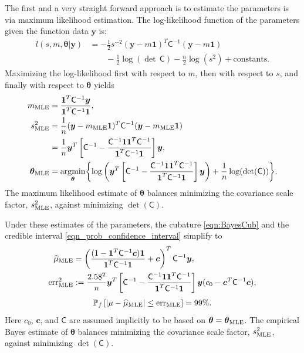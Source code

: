 \documentclass{iitthesis}          %
\newcommand{\bm}[1]{\boldsymbol{#1}}
\newcommand{\vtheta}{{\bm{\theta}}}
\newcommand{\vc}{\bm{c}}
\newcommand{\vy}{\bm{y}}
\newcommand{\vone}{\bm{1}}
\newcommand{\mC}{\mathsf{C}}
\newcommand{\mCInv}{{\mathsf{C}^{-1}}}
\newcommand{\hmu}{\widehat{\mu}}
\newcommand{\MLE}{\textup{MLE}}
\newcommand{\err}{\textup{err}}
\providecommand{\argmin}{\operatorname*{argmin}}
\begin{document}
  \label{sec:MLE}
The first and a very straight forward approach is to estimate the parameters is via maximum likelihood estimation.  The log-likelihood function of the parameters given the function data $\vy$ is:
\begin{align*}
l(s,m,\vtheta | \vy)
&= -\frac{1}{2} s^{-2} (\vy-m\vone)^T\mCInv(\vy-m\vone) 
\\ & \qquad
 - \frac{1}{2} \log(\det\, \mC) - \frac{n}{2} \log(s^2) + \text{constants.}
\end{align*}
Maximizing the log-likelihood first with respect to $m$, then with respect to $s$, and finally with respect to $\vtheta$ yields
\begin{align*}
m_\MLE &= \frac{\vone^T \mCInv \vy }{ \vone^T \mCInv \vone}, \\
\nonumber
s^2_{\MLE}  
&= \frac{1}{n} (\vy-m_{\MLE}\vone)^T\mCInv(\vy-m_{\MLE}\vone) 
\\
&= 
\frac{1}{n}
\vy^T 
\left[ 
\mCInv - 
\frac{ \mCInv \vone \vone^T \mCInv }{\vone^T\mCInv \vone}
\right] \vy, \\
\vtheta_\MLE
&= \argmin_{\vtheta} \biggl \{
\log\left(\vy^T 
\left[ \mCInv - 
\frac{ \mCInv \vone \vone^T \mCInv }{\vone^T\mCInv \vone}
\right] \vy 
\right)  +  \frac{1}{n} \log(\det(\mC))
\biggr \}.
\end{align*}
The maximum likelihood estimate of $\vtheta$ balances minimizing the covariance scale factor, $s^2_{\MLE}$, against minimizing  $\det(\mC)$. 

Under these estimates of the parameters, the cubature \eqref{eqn:BayesCub} and the credible interval \eqref{eqn_prob_confidence_interval} simplify to 
\begin{align*} %
\hmu_\MLE  &= 
\left(
\frac{ (1 - \vone^T  \mCInv\vc )  \vone }{ \vone^T \mCInv \vone}   +  \vc 
\right)^T  \mCInv \vy, \\
\err_\MLE^2 & : = \frac{2.58^2}{n}
 \vy^T \left[ \mCInv - 
\frac{ \mCInv \vone \vone^T \mCInv }{\vone^T\mCInv \vone}
\right] \vy  
(c_0 - \vc^T\mC^{-1}\vc ),
\end{align*}
\begin{align}
\label{eqn_prob_CI_MLE}
\mathbb{P}_f \left[
|\mu-\hmu_\MLE| \leq \err_\MLE \right]  = 99\%.
\end{align}
Here $c_0$, $\vc$, and $\mC$ are assumed implicitly to be based on $\vtheta = \vtheta_\MLE$.   
The empirical Bayes estimate of $\vtheta$ balances minimizing the covariance scale factor, $s^2_{\MLE}$, against minimizing  $\det(\mC)$. 
\end{document}
